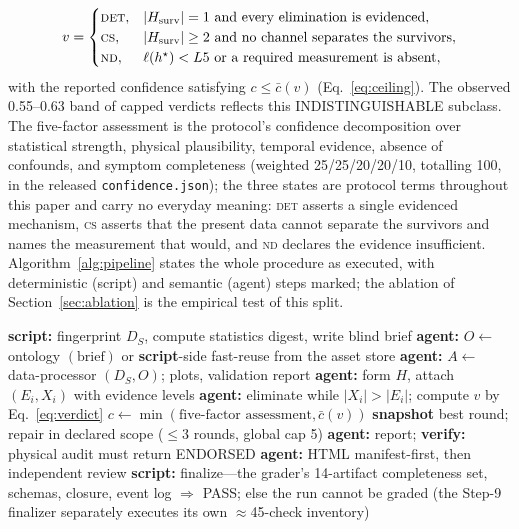 \documentclass[preprint,10pt]{elsarticle}
\begin{document}
\begin{equation}
v = \begin{cases}
\textsc{det}, & |H_{\mathrm{surv}}| = 1 \ \text{and every elimination is evidenced},\\
\textsc{cs}, & |H_{\mathrm{surv}}| \ge 2 \ \text{and no channel separates the survivors},\\
\textsc{nd}, & \ell(h^\star) < L5 \ \text{or a required measurement is absent},
\end{cases}
\label{eq:verdict}
\end{equation}
with the reported confidence satisfying $c \le \bar{c}(v)$ (Eq.~\eqref{eq:ceiling}). The observed 0.55--0.63 band of capped verdicts reflects this INDISTINGUISHABLE subclass. The five-factor assessment is the protocol's confidence decomposition over statistical strength, physical plausibility, temporal evidence, absence of confounds, and symptom completeness (weighted 25/25/20/20/10, totalling 100, in the released \texttt{confidence.json}); the three states are protocol terms throughout this paper and carry no everyday meaning: \textsc{det} asserts a single evidenced mechanism, \textsc{cs} asserts that the present data cannot separate the survivors and names the measurement that would, and \textsc{nd} declares the evidence insufficient. Algorithm~\ref{alg:pipeline} states the whole procedure as executed, with deterministic (script) and semantic (agent) steps marked; the ablation of Section~\ref{sec:ablation} is the empirical test of this split.

\begin{algorithm}[!t]
\caption{IDD diagnosis of scenario $S$ (script = deterministic code, agent = semantic reasoning; gates as in Table~\ref{tab:checkpoints})}
\label{alg:pipeline}
\begin{algorithmic}[1]
\State \textbf{script:} fingerprint $D_S$, compute statistics digest, write blind brief 
\State \textbf{agent:} $O \leftarrow$ ontology $(\text{brief})$ or \textbf{script}-side fast-reuse from the asset store 
\State \textbf{agent:} $A \leftarrow$ data-processor $(D_S, O)$; plots, validation report 
\State \textbf{agent:} form $H$, attach $(E_i, X_i)$ with evidence levels 
\State \textbf{agent:} eliminate while $|X_i| > |E_i|$; compute $v$ by Eq.~\eqref{eq:verdict}
\State $c \leftarrow \min(\text{five-factor assessment}, \bar{c}(v))$ 
 \textbf{snapshot} best round; repair in declared scope ($\le 3$ rounds, global cap 5)
\EndIf {}
\State \textbf{agent:} report; \textbf{verify:} physical audit must return ENDORSED 
\State \textbf{agent:} HTML manifest-first, then independent review 
\State \textbf{script:} finalize---the grader's 14-artifact completeness set, schemas, closure, event log $\Rightarrow$ PASS; else the run cannot be graded (the Step-9 finalizer separately executes its own $\approx$45-check inventory)
\end{algorithmic}
\end{algorithm}
\end{document}
